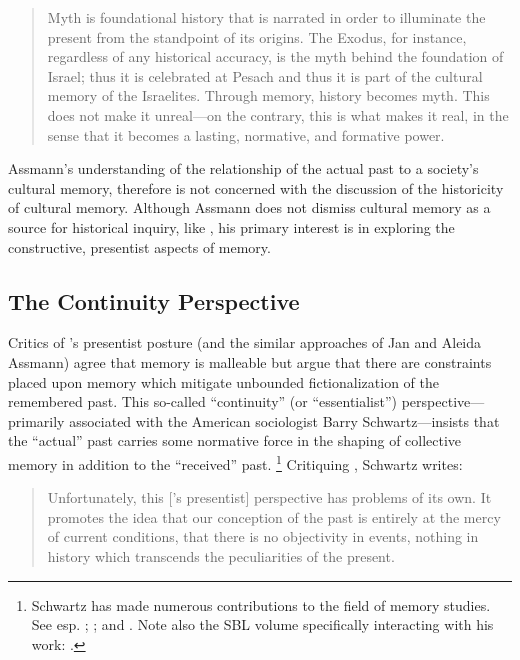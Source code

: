 \begin{quote}
    Myth is foundational history that is narrated in order to illuminate the present from the standpoint of its origins. The Exodus, for instance, regardless of any historical accuracy, is the myth behind the foundation of Israel; thus it is celebrated at Pesach and thus it is part of the cultural memory of the Israelites. Through memory, history becomes myth. This does not make it unreal---on the contrary, this is what makes it real, in the sense that it becomes a lasting, normative, and formative power.%
        \autocite[38]{assmann2011}
\end{quote}  
\noindent
Assmann's understanding of the relationship of the actual past to a society's cultural memory, therefore is not concerned with the discussion of the historicity of cultural memory. Although Assmann does not dismiss cultural memory as a source for historical inquiry, like \halbwachs, his primary interest is in exploring the constructive, presentist aspects of memory.  

\subsection{The Continuity Perspective} 

Critics of \halbwachs's presentist posture (and the similar approaches of Jan and Aleida Assmann) agree that memory is malleable but argue that there are constraints placed upon memory which mitigate unbounded fictionalization of the remembered past. This so-called ``continuity'' (or ``essentialist'') perspective---primarily associated with the American sociologist Barry Schwartz---insists that the ``actual'' past carries some normative force in the shaping of collective memory in addition to the ``received'' past.%
    \footnote{%
        Schwartz has made numerous contributions to the field of memory studies. See esp.
        \cite{schwartz_sf1982};
        \cite{schwartz_asr1991}; and
        \cite{schwartz2000}. Note also the SBL volume specifically interacting with his work:
        \cite{thatcher2014}.}
Critiquing \halbwachs, Schwartz writes:  

\begin{quote}
    Unfortunately, this [\halbwachs's presentist] perspective has problems of its own. It promotes the idea that our conception of the past is entirely at the mercy of current conditions, that there is no objectivity in events, nothing in history which transcends the peculiarities of the present.%
        \autocite[376]{schwartz_sf1982}
\end{quote}  

